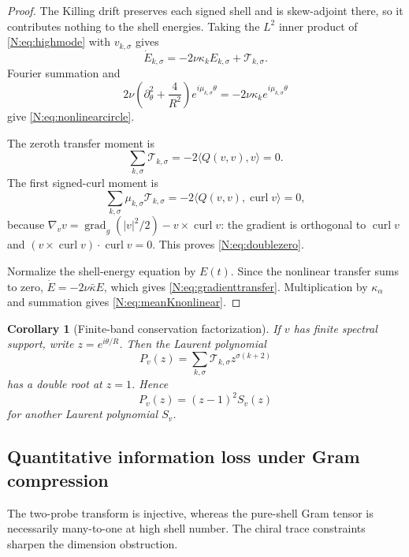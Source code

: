 \documentclass[
 aps,
 prd,
 reprint,
 amsmath,
 amssymb,
 nofootinbib,
 superscriptaddress
]{revtex4-2}
\newtheorem{corollary}[theorem]{Corollary}
\theoremstyle{definition}
\theoremstyle{remark}
\newcommand{\curl}{\operatorname{curl}}
\newcommand{\gradg}{\operatorname{grad}_g}
\begin{document}
\begin{proof}
The Killing drift preserves each signed shell and is skew-adjoint there, so
it contributes nothing to the shell energies.  Taking the \(L^2\) inner
product of \eqref{N:eq:highmode} with \(v_{k,\sigma}\) gives
\[
 \dot E_{k,\sigma}
 =
 -2\nu\kappa_kE_{k,\sigma}
 +
 \mathcal T_{k,\sigma}.
\]
Fourier summation and
\[
 2\nu
 \left(\partial_\theta^2+\frac4{R^2}\right)
 e^{i\mu_{k,\sigma}\theta}
 =
 -2\nu\kappa_k
 e^{i\mu_{k,\sigma}\theta}
\]
give \eqref{N:eq:nonlinearcircle}.

The zeroth transfer moment is
\[
 \sum_{k,\sigma}\mathcal T_{k,\sigma}
 =
 -2\langle Q(v,v),v\rangle
 =
 0.
\]
The first signed-curl moment is
\[
 \sum_{k,\sigma}
 \mu_{k,\sigma}\mathcal T_{k,\sigma}
 =
 -2\langle Q(v,v),\curl v\rangle
 =
 0,
\]
because
\(\nabla_vv=\gradg(|v|^2/2)-v\times\curl v\):
the gradient is orthogonal to \(\curl v\) and
\((v\times\curl v)\cdot\curl v=0\).
This proves \eqref{N:eq:doublezero}.

Normalize the shell-energy equation by \(E(t)\).  Since the nonlinear
transfer sums to zero,
\(\dot E=-2\nu\bar\kappa E\), which gives
\eqref{N:eq:gradienttransfer}.  Multiplication by \(\kappa_\alpha\) and
summation gives \eqref{N:eq:meanKnonlinear}.
\end{proof}

\begin{corollary}[Finite-band conservation factorization]
\label{N:cor:transferfactor}
If \(v\) has finite spectral support, write
\(z=e^{i\theta/R}\).
Then the Laurent polynomial
\[
 P_v(z)
 =
 \sum_{k,\sigma}
 \mathcal T_{k,\sigma}
 z^{\sigma(k+2)}
\]
has a double root at \(z=1\).  Hence
\begin{equation}
 \boxed{
 P_v(z)=(z-1)^2S_v(z)
 }
 \label{N:eq:transferfactor}
\end{equation}
for another Laurent polynomial \(S_v\).
\end{corollary}

\subsection{Quantitative information loss under Gram compression}

The two-probe transform is injective, whereas the pure-shell Gram tensor is
necessarily many-to-one at high shell number.  The chiral trace constraints
sharpen the dimension obstruction.
\end{document}
